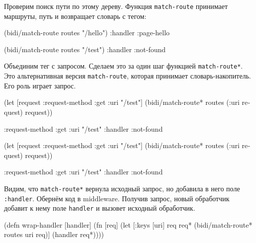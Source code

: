 
Проверим поиск пути по этому дереву. Функция \verb|match-route| принимает
маршруты, путь и возвращает словарь с тегом:

\begin{english}
  \begin{clojure}
(bidi/match-route routes "/hello")
{:handler :page-hello}

(bidi/match-route routes "/test")
{:handler :not-found}
  \end{clojure}
\end{english}


Объединим тег с запросом. Сделаем это за один шаг функцией
\verb|match-route*|. Это альтернативная версия \verb|match-route|, которая
принимает словарь-накопитель. Его роль играет запрос.

\ifx\DEVICETYPE\MOBILE

\begin{english}
  \begin{clojure}
(let [request {:request-method :get
               :uri "/test"}]
  (bidi/match-route*
    routes (:uri request) request))

{:request-method :get
 :uri "/test"
 :handler :not-found}
  \end{clojure}
\end{english}

\else

\begin{english}
  \begin{clojure}
(let [request {:request-method :get
               :uri "/test"}]
  (bidi/match-route* routes (:uri request) request))

{:request-method :get
 :uri "/test"
 :handler :not-found}
  \end{clojure}
\end{english}

\fi

Видим, что \verb|match-route*| вернула исходный запрос, но добавила в него
поле \verb|:handler|. Обернём код в middleware. Получив запрос, новый
обработчик добавит к нему поле \verb|handler| и вызовет исходный обработчик.

\ifx\DEVICETYPE\MOBILE

\begin{english}
  \begin{clojure}
(defn wrap-handler [handler]
  (fn [req]
    (let [{:keys [uri]} req
           req* (bidi/match-route*
                  routes uri req)]
      (handler req*))))
  \end{clojure}
\end{english}

